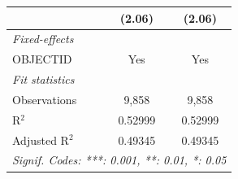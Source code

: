 \begin{table}[htbp]
\begin{tabular}{lcc}
                       & (2.06)        & (2.06)\\   
      \midrule
      \emph{Fixed-effects}\\
      OBJECTID         & Yes           & Yes\\  
      \midrule
      \emph{Fit statistics}\\
      Observations     & 9,858         & 9,858\\  
      R$^2$            & 0.52999       & 0.52999\\  
      Adjusted R$^2$   & 0.49345       & 0.49345\\  
      \midrule \midrule
      \multicolumn{3}{l}{\emph{Signif. Codes: ***: 0.001, **: 0.01, *: 0.05}}\\
   \end{tabular}
\end{table}


